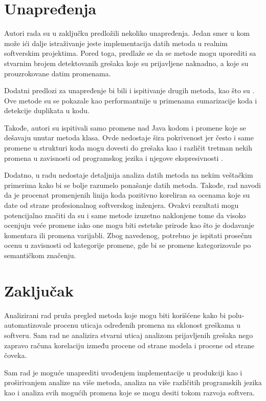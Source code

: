 \documentclass[twocolumns]{article}
\begin{document}
\begin{multicols}{2}
  
  
  \section{Unapređenja}
  \label{sec:improvements}
  
  Autori rada su u zaključku predložili nekoliko unapređenja. Jedan smer u kom može ići dalje istraživanje jeste implementacija datih metoda u realnim softverskim projektima. Pored toga, predlaže se da se metode mogu uporediti sa stvarnim brojem detektovanih grešaka koje su prijavljene naknadno, a koje su prouzrokovane datim promenama. 
  
  Dodatni predlozi za unapređenje bi bili i ispitivanje drugih metoda, kao što su \cite{guo2020graphcodebert,ligraphplbart,hoang2020cc2vec}. Ove metode su se pokazale kao performantnije u primenama sumarizacije koda i detekcije duplikata u kodu. 
  
  Takođe, autori su ispitivali samo promene nad Java kodom i promene koje se dešavaju unutar metoda klasa. Ovde nedostaje šira pokrivenost jer često i same promene u strukturi koda mogu dovesti do grešaka kao i različit tretman nekih promena u zavisnosti od programskog jezika i njegove ekspresivnosti \cite{torley2008expressiveness}. 
  
  Dodatno, u radu nedostaje detaljnija analiza datih metoda na nekim veštačkim primerima kako bi se bolje razumelo ponašanje datih metoda. Takođe, rad navodi da je procenat promenjenih linija koda pozitivno koreliran sa ocenama koje su date od strane profesionalnog softverskog inženjera. Ovakvi rezultati mogu potencijalno značiti da su i same metode izuzetno naklonjene tome da visoko ocenjuju veće promene iako one mogu biti estetske prirode kao što je dodavanje komentara ili promena varijabli. Zbog navedenog, potrebno je ispitati prosečnu ocenu u zavisnosti od kategorije promene, gde bi se promene kategorizovale po semantičkom značenju. 
  
  
  \section{Zaključak}
  \label{sec:conclusion}
  
  Analizirani rad pruža pregled metoda koje mogu biti korišćene kako bi polu-automatizovale procenu uticaja određenih promena na sklonost greškama u softveru. Sam rad ne analizira stvarni uticaj analizom prijavljenih grešaka nego zapravo računa korelaciju između procene od strane modela i procene od strane čoveka. 
  
  Sam rad je moguće unaprediti uvođenjem implementacije u produkciji kao i proširivanjem analize na više metoda, analiza na više različitih programskih jezika kao i analiza svih mogućih promena koje se mogu desiti tokom razvoja softvera. 
  
  
  
  
  
  
\end{multicols}
\end{document}
